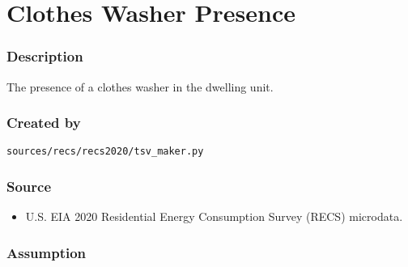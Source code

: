 \section{Clothes Washer Presence}\label{clothes_washer_presence}

\subsubsection{Description}\label{description-18}

The presence of a clothes washer in the dwelling unit.

\subsubsection{Created by}\label{created-by-18}

\texttt{sources/recs/recs2020/tsv\_maker.py}

\subsubsection{Source}\label{source-18}

\begin{itemize}
 
\item
  U.S. EIA 2020 Residential Energy Consumption Survey (RECS) microdata.
\end{itemize}

\subsubsection{Assumption}\label{assumption-9}

